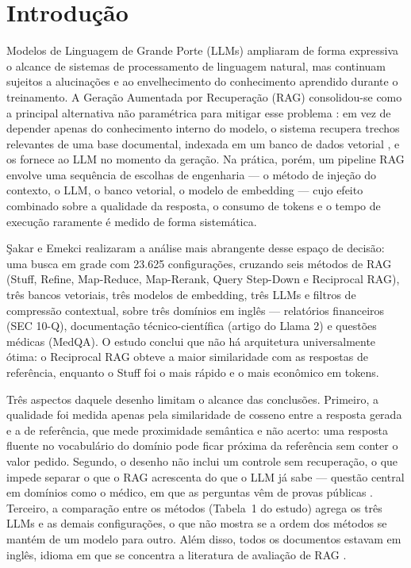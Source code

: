\section{Introdução}
\label{sc:introducao}

 Modelos de Linguagem de Grande Porte (LLMs) ampliaram de forma expressiva o alcance de sistemas de processamento de linguagem natural, mas continuam sujeitos a alucinações e ao envelhecimento do conhecimento aprendido durante o treinamento. A Geração Aumentada por Recuperação (RAG) \cite{lewis2020rag} consolidou-se como a principal alternativa não paramétrica para mitigar esse problema \cite{andriopoulos2023augmenting}: em vez de depender apenas do conhecimento interno do modelo, o sistema recupera trechos relevantes de uma base documental, indexada em um banco de dados vetorial \cite{ma2024vectorsurvey}, e os fornece ao LLM no momento da geração. Na prática, porém, um pipeline RAG envolve uma sequência de escolhas de engenharia --- o método de injeção do contexto, o LLM, o banco vetorial, o modelo de embedding --- cujo efeito combinado sobre a qualidade da resposta, o consumo de tokens e o tempo de execução raramente é medido de forma sistemática.

Şakar e Emekci \cite{sakar2025rag} realizaram a análise mais abrangente desse espaço de decisão: uma busca em grade com 23.625 configurações, cruzando seis métodos de RAG (Stuff, Refine, Map-Reduce, Map-Rerank, Query Step-Down e Reciprocal RAG), três bancos vetoriais, três modelos de embedding, três LLMs e filtros de compressão contextual, sobre três domínios em inglês --- relatórios financeiros (SEC 10-Q), documentação técnico-científica (artigo do Llama 2) e questões médicas (MedQA). O estudo conclui que não há arquitetura universalmente ótima: o Reciprocal RAG obteve a maior similaridade com as respostas de referência, enquanto o Stuff foi o mais rápido e o mais econômico em tokens.

Três aspectos daquele desenho limitam o alcance das conclusões. Primeiro, a qualidade foi medida apenas pela similaridade de cosseno entre a resposta gerada e a de referência, que mede proximidade semântica e não acerto: uma resposta fluente no vocabulário do domínio pode ficar próxima da referência sem conter o valor pedido. Segundo, o desenho não inclui um controle sem recuperação, o que impede separar o que o RAG acrescenta do que o LLM já sabe --- questão central em domínios como o médico, em que as perguntas vêm de provas públicas \cite{mallen2023trust, xiong2024mirage}. Terceiro, a comparação entre os métodos (Tabela~1 do estudo) agrega os três LLMs e as demais configurações, o que não mostra se a ordem dos métodos se mantém de um modelo para outro. Além disso, todos os documentos estavam em inglês, idioma em que se concentra a literatura de avaliação de RAG \cite{medeiros2025embeddings}.

